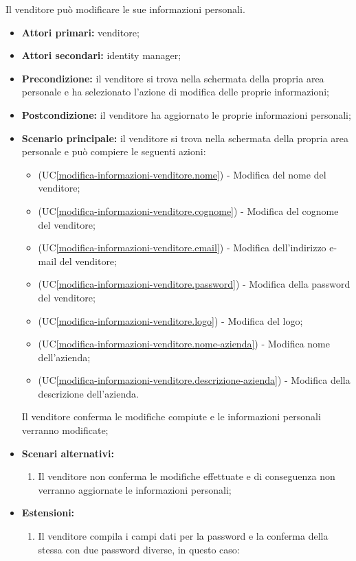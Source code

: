 Il venditore può modificare le sue informazioni personali.
\begin{itemize}
    \item \textbf{Attori primari:} venditore;
    \item \textbf{Attori secondari:} identity manager;
    \item \textbf{Precondizione:} il venditore si trova nella schermata della propria area personale e ha selezionato l'azione di modifica delle proprie informazioni;
    \item \textbf{Postcondizione:} il venditore ha aggiornato le proprie informazioni personali;
    \item \textbf{Scenario principale:} il venditore si trova nella schermata della propria area personale e può compiere le seguenti azioni:
    \begin{itemize}
    	\item (UC\ref{modifica-informazioni-venditore.nome}) - Modifica del nome del venditore;
    	\item (UC\ref{modifica-informazioni-venditore.cognome}) - Modifica del cognome del venditore;
        \item (UC\ref{modifica-informazioni-venditore.email}) - Modifica dell'indirizzo e-mail del venditore;
        \item (UC\ref{modifica-informazioni-venditore.password}) - Modifica della password del venditore;
        \item (UC\ref{modifica-informazioni-venditore.logo}) - Modifica del logo;
        \item (UC\ref{modifica-informazioni-venditore.nome-azienda}) - Modifica nome dell'azienda;
        \item (UC\ref{modifica-informazioni-venditore.descrizione-azienda}) - Modifica della descrizione dell'azienda.
    \end{itemize}
    Il venditore conferma le modifiche compiute e le informazioni personali verranno modificate;
    \item \textbf{Scenari alternativi:}
    \begin{enumerate}[label=\lett]
    	\item Il venditore non conferma le modifiche effettuate e di conseguenza non verranno aggiornate le informazioni personali;
    \end{enumerate}
    \item \textbf{Estensioni:}
    \begin{enumerate}[label=\lett]
    	\item Il venditore compila i campi dati per la password e la conferma della stessa con due password diverse, in questo caso:

\end{enumerate}
\end{itemize}
